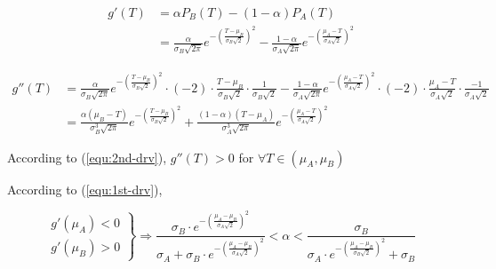 \documentclass[10pt,a4paper]{article}
\begin{document}
	\begin{equation}\label{equ:1st-drv}
		\begin{split}
		g'(T) & = \alpha P_B(T) - (1 - \alpha) P_A(T)\\
		& = \frac{\alpha}{\sigma_B\sqrt{2\pi}}e^{-(\frac{T - \mu_B}{\sigma_B\sqrt{2}})^2}
		- \frac{1 - \alpha}{\sigma_A\sqrt{2\pi}}e^{-(\frac{\mu_A - T}{\sigma_A\sqrt{2}})^2}
		\end{split}
	\end{equation}
	
	\begin{equation}\label{equ:2nd-drv}
		\begin{split}
		g''(T) & = \frac{\alpha}{\sigma_B\sqrt{2\pi}}
		e^{-(\frac{T - \mu_B}{\sigma_B\sqrt{2}})^2} \cdot (-2) \cdot 
		\frac{T - \mu_B}{\sigma_B\sqrt{2}} \cdot \frac{1}{\sigma_B\sqrt{2}}
		- \frac{1 - \alpha}{\sigma_A\sqrt{2\pi}}
		e^{-(\frac{\mu_A - T}{\sigma_A\sqrt{2}})^2} \cdot (-2) \cdot 
		\frac{\mu_A - T}{\sigma_A\sqrt{2}} \cdot \frac{-1}{\sigma_A\sqrt{2}}\\
		& = \frac{\alpha(\mu_B - T)}{\sigma_B^3\sqrt{2\pi}}
		e^{-(\frac{T - \mu_B}{\sigma_B\sqrt{2}})^2}
		+ \frac{(1 - \alpha)(T - \mu_A)}{\sigma_A^3\sqrt{2\pi}}
		e^{-(\frac{\mu_A - T}{\sigma_A\sqrt{2}})^2}
		\end{split}
	\end{equation}
	
	According to (\ref{equ:2nd-drv}), $g''(T) > 0$ for $\forall T \in (\mu_A, \mu_B)$
	
	According to (\ref{equ:1st-drv}), 
	
	\begin{equation}
		\left.
		\begin{aligned}
		g'(\mu_A) < 0\\
		g'(\mu_B) > 0
		\end{aligned}
		\right\}
		\Rightarrow \frac{\sigma_B \cdot e^{-(\frac{\mu_A - \mu_B}{\sigma_A\sqrt{2}})^2}}{\sigma_A + \sigma_B \cdot 
		e^{-(\frac{\mu_A - \mu_B}{\sigma_A\sqrt{2}})^2}}
		< \alpha < \frac{\sigma_B}{\sigma_A \cdot 
		e^{-(\frac{\mu_A - \mu_B}{\sigma_B\sqrt{2}})^2} + \sigma_B}
	\end{equation}
	
\end{document}
